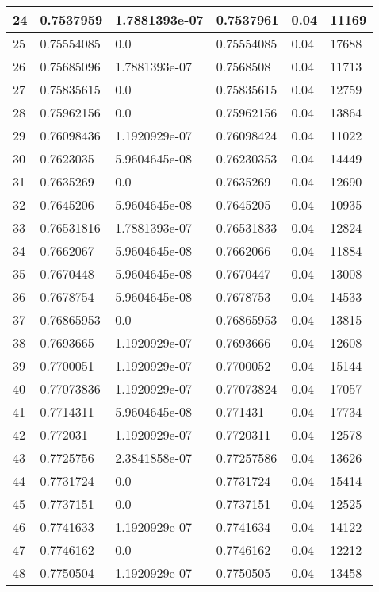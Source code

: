 \begin{longtable}{|l|l|l|l|l|l|}
24 & 0.7537959 & 1.7881393e-07 & 0.7537961 & 0.04 & 11169 \\ \hline 
25 & 0.75554085 & 0.0 & 0.75554085 & 0.04 & 17688 \\ \hline 
26 & 0.75685096 & 1.7881393e-07 & 0.7568508 & 0.04 & 11713 \\ \hline 
27 & 0.75835615 & 0.0 & 0.75835615 & 0.04 & 12759 \\ \hline 
28 & 0.75962156 & 0.0 & 0.75962156 & 0.04 & 13864 \\ \hline 
29 & 0.76098436 & 1.1920929e-07 & 0.76098424 & 0.04 & 11022 \\ \hline 
30 & 0.7623035 & 5.9604645e-08 & 0.76230353 & 0.04 & 14449 \\ \hline 
31 & 0.7635269 & 0.0 & 0.7635269 & 0.04 & 12690 \\ \hline 
32 & 0.7645206 & 5.9604645e-08 & 0.7645205 & 0.04 & 10935 \\ \hline 
33 & 0.76531816 & 1.7881393e-07 & 0.76531833 & 0.04 & 12824 \\ \hline 
34 & 0.7662067 & 5.9604645e-08 & 0.7662066 & 0.04 & 11884 \\ \hline 
35 & 0.7670448 & 5.9604645e-08 & 0.7670447 & 0.04 & 13008 \\ \hline 
36 & 0.7678754 & 5.9604645e-08 & 0.7678753 & 0.04 & 14533 \\ \hline 
37 & 0.76865953 & 0.0 & 0.76865953 & 0.04 & 13815 \\ \hline 
38 & 0.7693665 & 1.1920929e-07 & 0.7693666 & 0.04 & 12608 \\ \hline 
39 & 0.7700051 & 1.1920929e-07 & 0.7700052 & 0.04 & 15144 \\ \hline 
40 & 0.77073836 & 1.1920929e-07 & 0.77073824 & 0.04 & 17057 \\ \hline 
41 & 0.7714311 & 5.9604645e-08 & 0.771431 & 0.04 & 17734 \\ \hline 
42 & 0.772031 & 1.1920929e-07 & 0.7720311 & 0.04 & 12578 \\ \hline 
43 & 0.7725756 & 2.3841858e-07 & 0.77257586 & 0.04 & 13626 \\ \hline 
44 & 0.7731724 & 0.0 & 0.7731724 & 0.04 & 15414 \\ \hline 
45 & 0.7737151 & 0.0 & 0.7737151 & 0.04 & 12525 \\ \hline 
46 & 0.7741633 & 1.1920929e-07 & 0.7741634 & 0.04 & 14122 \\ \hline 
47 & 0.7746162 & 0.0 & 0.7746162 & 0.04 & 12212 \\ \hline 
48 & 0.7750504 & 1.1920929e-07 & 0.7750505 & 0.04 & 13458 \\ \hline 

\end{longtable}
